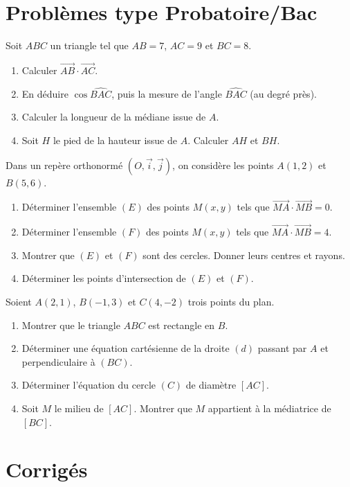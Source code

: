\section{Problèmes type Probatoire/Bac}

Soit $ABC$ un triangle tel que $AB=7$, $AC=9$ et $BC=8$.
\begin{enumerate}[label=\arabic*)]
\item Calculer $\overrightarrow{AB}\cdot\overrightarrow{AC}$.
\item En déduire $\cos\widehat{BAC}$, puis la mesure de l'angle $\widehat{BAC}$ (au degré près).
\item Calculer la longueur de la médiane issue de $A$.
\item Soit $H$ le pied de la hauteur issue de $A$. Calculer $AH$ et $BH$.
\end{enumerate}

Dans un repère orthonormé $(O,\vec{i},\vec{j})$, on considère les points $A(1,2)$ et $B(5,6)$.
\begin{enumerate}[label=\arabic*)]
\item Déterminer l'ensemble $(E)$ des points $M(x,y)$ tels que $\overrightarrow{MA}\cdot\overrightarrow{MB}=0$.
\item Déterminer l'ensemble $(F)$ des points $M(x,y)$ tels que $\overrightarrow{MA}\cdot\overrightarrow{MB}=4$.
\item Montrer que $(E)$ et $(F)$ sont des cercles. Donner leurs centres et rayons.
\item Déterminer les points d'intersection de $(E)$ et $(F)$.
\end{enumerate}

Soient $A(2,1)$, $B(-1,3)$ et $C(4,-2)$ trois points du plan.
\begin{enumerate}[label=\arabic*)]
\item Montrer que le triangle $ABC$ est rectangle en $B$.
\item Déterminer une équation cartésienne de la droite $(d)$ passant par $A$ et perpendiculaire à $(BC)$.
\item Déterminer l'équation du cercle $(C)$ de diamètre $[AC]$.
\item Soit $M$ le milieu de $[AC]$. Montrer que $M$ appartient à la médiatrice de $[BC]$.
\end{enumerate}

\section{Corrigés}

